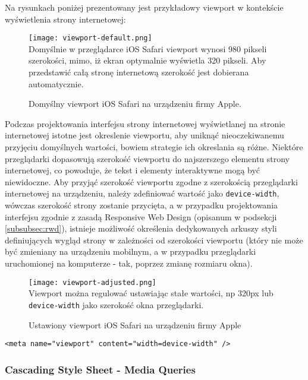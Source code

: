 Na rysunkach poniżej prezentowany jest przykładowy viewport w kontekście wyświetlenia strony internetowej:

\begin{figure}[h!]
  \caption[Apple default viewport w Safari iOS]{Domyślny viewport iOS Safari na urządzeniu firmy Apple.}
  \centering
    \texttt{[image: viewport-default.png]} \\
    Domyślnie w przeglądarce iOS Safari viewport wynosi 980 pikseli szerokości, mimo, iż ekran optymalnie wyświetla 320 pikseli. Aby przedstawić całą stronę internetową szerokość jest dobierana automatycznie.
\end{figure}

Podczas projektowania interfejsu strony internetowej wyświetlanej na stronie internetowej istotne jest okreslenie viewportu, aby uniknąć nieoczekiwanemu przyjęciu domyślnych wartości, bowiem strategie ich okreslania są różne. Niektóre przeglądarki dopasowują szerokość viewportu do najszerszego elementu strony internetowej, co powoduje, że tekst i elementy interaktywne mogą być niewidoczne. Aby przyjąć szerokość viewportu zgodne z szerokością przeglądarki internetowej na urządzeniu, należy zdefiniować wartość jako \lstinline{device-width}, wówczas szerokość strony zostanie przycięta, a w przypadku projektowania interfejsu zgodnie z zasadą Responsive Web Design (opisanum w podsekcji \ref{subsubsec:rwd}), istnieje możliwość określenia dedykowanych arkuszy styli definiujących wygląd strony w zależności od szerokości viewportu (który nie może być zmieniany na urządzeniu mobilnym, a w przypadku przeglądarki uruchomionej na komputerze - tak, poprzez zmianę rozmiaru okna).

\begin{figure}[h!]
  \caption[Apple fixed viewport w Safari iOS]{Ustawiony viewport iOS Safari na urządzeniu firmy Apple}
  \centering
    \texttt{[image: viewport-adjusted.png]} \\
    Viewport można regulować ustawiając stałe wartości, np 320px lub \lstinline{device-width} jako szerokość okna przeglądarki.
\end{figure}

\lstset{language=HTML}
\begin{lstlisting}
<meta name="viewport" content="width=device-width" />
\end{lstlisting}

\subsubsection{Cascading Style Sheet - Media Queries}

